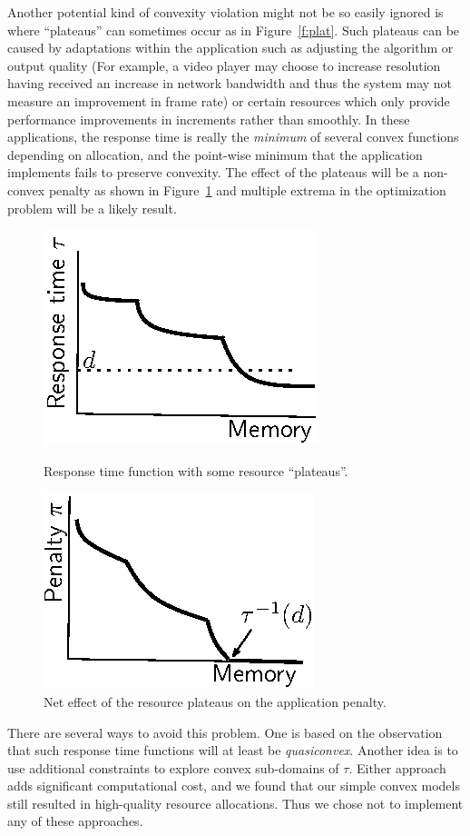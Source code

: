 Another potential kind of convexity violation might not be so easily ignored is where ``plateaus'' can sometimes occur as in Figure~\ref{f:plat}. Such plateaus can be caused by adaptations within the application such as adjusting the algorithm or output quality (For example, a video player may choose to increase resolution having received an increase in network bandwidth and thus the system may not measure an improvement in frame rate) or certain resources which only provide performance improvements in increments rather than smoothly.
In these applications, the response time is really the \emph{minimum} of several convex functions depending on allocation, and the point-wise minimum that the application implements fails to preserve convexity.  The effect of the plateaus will be a non-convex penalty as shown in Figure~\ref{f:plateffect} and multiple extrema in the optimization problem will be a likely result. 


\begin{figure}[hb]
\parbox{3in}{
\includegraphics*[width=.45\columnwidth]{Figures/Plateau1.eps}
\caption{\label{f:plat}Response time function with some resource ``plateaus''.}
}
\hspace{\fill}
\parbox{3in}{
\includegraphics*[width=.45\columnwidth]{Figures/Plateau2.eps}
\caption{\label{f:plateffect}Net effect of the resource plateaus on the application penalty.}
}
\end{figure}

There are several ways to avoid this problem.  One is based on the observation that such response time functions will at least be \emph{quasiconvex}.  Another idea is to use additional constraints to explore convex sub-domains of $\tau$. Either approach adds significant computational cost, and we found that our simple convex models still resulted in high-quality resource allocations. Thus we chose not to implement any of these approaches.  



